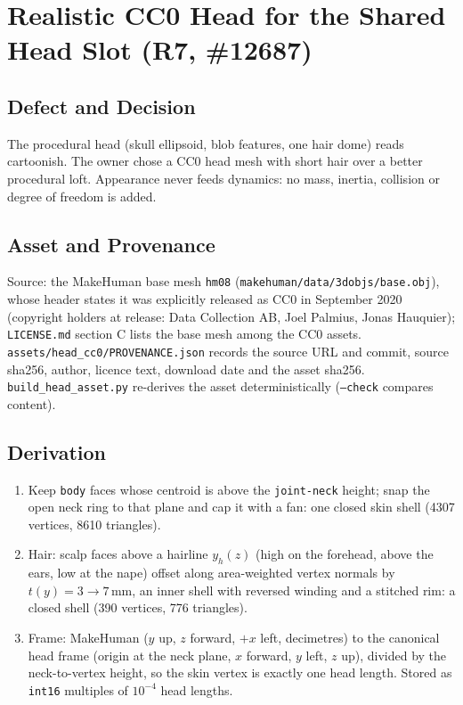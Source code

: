 \section{Realistic CC0 Head for the Shared Head Slot (R7, \#12687)}

\subsection{Defect and Decision}
The procedural head (skull ellipsoid, blob features, one hair dome) reads
cartoonish. The owner chose a CC0 head mesh with short hair over a better
procedural loft. Appearance never feeds dynamics: no mass, inertia, collision or
degree of freedom is added.

\subsection{Asset and Provenance}
Source: the MakeHuman base mesh \texttt{hm08} (\texttt{makehuman/data/3dobjs/base.obj}),
whose header states it was explicitly released as CC0 in September 2020
(copyright holders at release: Data Collection AB, Joel Palmius, Jonas Hauquier);
\texttt{LICENSE.md} section C lists the base mesh among the CC0 assets.
\texttt{assets/head\_cc0/PROVENANCE.json} records the source URL and commit,
source sha256, author, licence text, download date and the asset sha256.
\texttt{build\_head\_asset.py} re-derives the asset deterministically
(\texttt{--check} compares content).

\subsection{Derivation}
\begin{enumerate}
\item Keep \texttt{body} faces whose centroid is above the \texttt{joint-neck}
  height; snap the open neck ring to that plane and cap it with a fan: one
  closed skin shell (4307 vertices, 8610 triangles).
\item Hair: scalp faces above a hairline $y_h(z)$ (high on the forehead, above
  the ears, low at the nape) offset along area-weighted vertex normals by
  $t(y)=3\to7$\,mm, an inner shell with reversed winding and a stitched rim: a
  closed shell (390 vertices, 776 triangles).
\item Frame: MakeHuman ($y$ up, $z$ forward, $+x$ left, decimetres) to the
  canonical head frame (origin at the neck plane, $x$ forward, $y$ left, $z$
  up), divided by the neck-to-vertex height, so the skin vertex is exactly one
  head length. Stored as \texttt{int16} multiples of $10^{-4}$ head lengths.
\end{enumerate}

